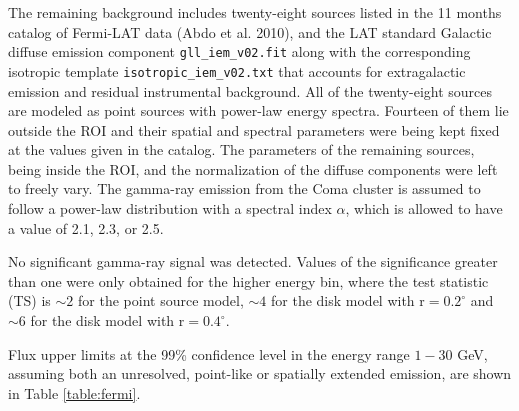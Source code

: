 \documentclass[12pt,manuscript]{aastex}
\begin{document}
The remaining background includes twenty-eight sources listed in the 11 months catalog of Fermi-LAT
data (Abdo et al. 2010), and the LAT standard Galactic diffuse emission component
\verb+gll_iem_v02.fit+ along with the corresponding isotropic template
\verb+isotropic_iem_v02.txt+ that accounts for extragalactic emission and residual instrumental
background. All of the twenty-eight sources are modeled as point sources with power-law energy
spectra. Fourteen of them lie outside the ROI and their spatial and spectral parameters were being
kept fixed at the values given in the catalog. The parameters of the remaining sources, being
inside the ROI, and the normalization of the diffuse components were left to freely vary. The
gamma-ray emission from the Coma cluster is assumed to follow a power-law distribution with a
spectral index $\alpha$, which is allowed to have a value of 2.1, 2.3, or 2.5.

No significant gamma-ray signal was detected. Values of the significance greater than one were only
obtained for the higher energy bin, where the test statistic (TS) is $\sim2$ for the point source
model, $\sim4$ for the disk model with r$=0.2^{\circ}$ and $\sim6$ for the disk model with
r$=0.4^{\circ}$.

Flux upper limits at the 99\% confidence level in the energy range $1-30$ GeV, assuming both an
unresolved, point-like or spatially extended emission, are shown in Table \ref{table:fermi}.


%
%
\end{document}

